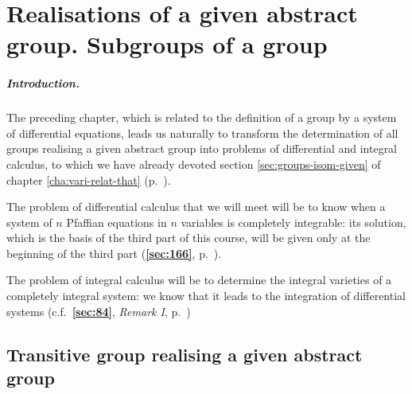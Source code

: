 \documentclass[leqno,11pt]{book}
\numberwithin{equation}{chapter}
\theoremstyle{shape1}
\theoremstyle{shapesmall}
\newcommand{\fsref}[1]{{\rm\textsection\textbf{\ref{sec:#1}}}}
\begin{document}
\chapter{Realisations of a given abstract group. Subgroups of a group}
\label{cha:real-given-abstr}

\paragraph{Introduction.}
\label{sec:115}
The preceding chapter, which is related to the definition of a group by a system of differential equations, leads us naturally to transform the determination of all groups realising a given abstract group into problems of differential and integral calculus, to which we have already devoted section \ref{sec:groups-isom-given} of chapter \ref{cha:vari-relat-that} (p.~\pageref{sec:groups-isom-given}).

The problem of differential calculus that we will meet will be to know when a system of $n$ Pfaffian equations in $n$ variables is completely integrable: its solution, which is the basis of the third part of this course, will be given only at the beginning of the third part (\fsref{166}, p.~\pageref{sec:166}). 

The problem of integral calculus will be to determine the integral varieties of a completely integral system: we know that it leads to the integration of differential systems (c.f.~\fsref{84}, \emph{Remark I}, p.~\pageref{sec:84})

\section{Transitive group realising a given abstract group}
\label{sec:trans-group-real}
\end{document}
